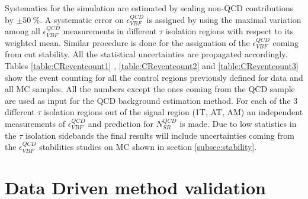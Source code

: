 Systematics for the simulation are estimated by scaling non-QCD contributions by $\pm50~\%$. A systematic error on $\epsilon^{QCD}_{VBF}$ is assigned by using the maximal variation among all $\epsilon^{QCD}_{VBF}$ measurements in different $\tau$ isolation regions with respect to its weighted mean. Similar procedure is done for the assignation of the $\epsilon^{QCD}_{VBF}$ coming from \met cut stability. All the statistical uncertainties are propagated accordingly. Tables \ref{table:CReventcount1} , \ref{table:CReventcount2} and \ref{table:CReventcount3} show the event counting for all the control regions previously defined for data and all MC samples. All the numbers except the ones coming from the QCD sample are used as input for the QCD background estimation method. For each of the 3 different $\tau$ isolation regions out of the signal region (1T, AT, AM) an independent measurements of $\epsilon^{QCD}_{VBF}$  and prediction for $N^{QCD}_{SR}$ is made. Due to low statistics in the $\tau$ isolation sidebands the final results will include uncertainties coming from the $\epsilon^{QCD}_{VBF}$ stabilities studies on MC shown in section \ref{subsec:stability}.



\section{Data Driven method validation}
\label{QCD_bg_pred_validation}

